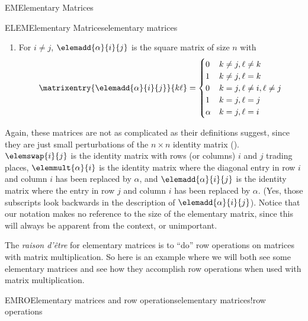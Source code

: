 \begin{subsect}{EM}{Elementary Matrices}
\begin{definition}{ELEM}{Elementary Matrices}{elementary matrices}
\begin{para}
\begin{enumerate}
\begin{equation*}
\begin{cases}
1        & k\neq i, \ell=k\\
\alpha & k=i, \ell=i
\end{cases}
\end{equation*}
%
\item For $i\neq j$, $\elemadd{\alpha}{i}{j}$ is the square matrix of size $n$ with
%
\begin{equation*}
\matrixentry{\elemadd{\alpha}{i}{j}}{k\ell}=
\begin{cases}
0 & k\neq j, \ell\neq k\\
1 & k\neq j, \ell=k\\
0 & k=j, \ell\neq i, \ell\neq j\\
1 & k=j, \ell=j\\
\alpha & k=j, \ell=i\\
\end{cases}
\end{equation*}
\end{enumerate}
\end{para}
%
\end{definition}
%
\begin{para}Again, these matrices are not as complicated as their definitions suggest, since they are just small perturbations of the $n\times n$ identity matrix ().  $\elemswap{i}{j}$ is the identity matrix with rows (or columns) $i$ and $j$ trading places, $\elemmult{\alpha}{i}$ is the identity matrix where the diagonal entry in row $i$ and column $i$ has been replaced by $\alpha$, and $\elemadd{\alpha}{i}{j}$ is the identity matrix where the entry in row $j$ and column $i$ has been replaced by $\alpha$. (Yes, those subscripts look backwards in the description of $\elemadd{\alpha}{i}{j}$).  Notice that our notation makes no reference to the size of the elementary matrix, since this will always be apparent from the context, or unimportant.\end{para}
%
\begin{para}The {\it raison d'\^{e}tre} for elementary matrices is to ``do'' row operations on matrices with matrix multiplication.  So here is an example where we will both see some elementary matrices and see how they accomplish row operations when used with matrix multiplication.\end{para}
%
\begin{example}{EMRO}{Elementary matrices and row operations}{elementary matrices!row operations}

\end{example}
\end{subsect}
